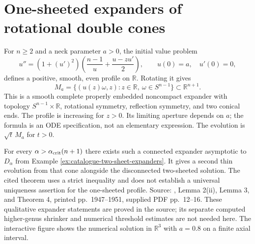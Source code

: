 \chapter{One-sheeted expanders of rotational double cones}\label{sec:catalogue-one-sheet-expanders}
\begin{example}\label{ex:catalogue-one-sheet-expanders}
For $n\geq2$ and a neck parameter $a>0$, the initial value problem
\[
 u''=(1+(u')^2)\left(\frac{n-1}{u}+\frac{u-zu'}2\right),
 \qquad u(0)=a,\quad u'(0)=0,
\]
defines a positive, smooth, even profile on $\mathbb R$. Rotating it gives
\[
 M_a=\{(u(z)\omega,z):z\in\mathbb R,\ \omega\in S^{n-1}\}
 \subset\mathbb R^{n+1}.
\]
This is a smooth complete properly embedded noncompact expander with topology $S^{n-1}\times\mathbb R$, rotational symmetry, reflection symmetry, and two conical ends. The profile is increasing for $z>0$. Its limiting aperture depends on $a$; the formula is an ODE specification, not an elementary expression. The evolution is $\sqrt t\,M_a$ for $t>0$.

For every $\alpha>\alpha_{\rm crit}(n+1)$ there exists such a connected expander asymptotic to $D_\alpha$ from Example \ref{ex:catalogue-two-sheet-expanders}. It gives a second thin evolution from that cone alongside the disconnected two-sheeted solution. The cited theorem uses a strict inequality and does not establish a universal uniqueness assertion for the one-sheeted profile. Source: \cite{CatAIC95}, Lemma 2(ii), Lemma 3, and Theorem 4, printed pp.~1947--1951, supplied PDF pp.~12--16. These qualitative expander statements are proved in the source; its separate computed higher-genus shrinker and numerical threshold estimates are not needed here. The interactive figure shows the numerical solution in $\mathbb R^3$ with $a=0.8$ on a finite axial interval.
\end{example}

